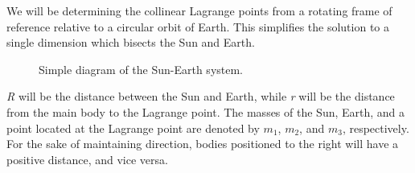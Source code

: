 We will be determining the collinear Lagrange points from a rotating frame of reference relative to a circular orbit of Earth.
This simplifies the solution to a single dimension which bisects the Sun and Earth. %

\vspace*{0.5cm}
\begin{figure}[!h]
	\centering
	\vspace*{0.25cm}
	\caption{Simple diagram of the Sun-Earth system.}
	\label{fig:collinear-coords}
\end{figure}

\textit{R} will be the distance between the Sun and Earth, while \textit{r} will be the distance from the main body to the Lagrange point. 
The masses of the Sun, Earth, and a point located at the Lagrange point are denoted by $m_1$, $m_2$, and $m_3$, respectively.
For the sake of maintaining direction, bodies positioned to the right will have a positive distance, and vice versa.

